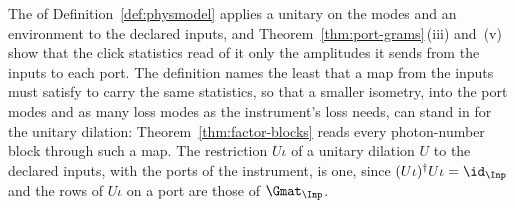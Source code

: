 
The  of Definition~\ref{def:physmodel} applies a unitary
on the modes and an environment to the declared inputs, and
Theorem~\ref{thm:port-grams}\,(iii) and~(v) show that the click statistics
read of it only the amplitudes it sends from the inputs to each port. The
definition names the least that a map from the inputs must satisfy to carry
the same statistics, so that a smaller isometry, into the port modes and as
many loss modes as the instrument's loss needs, can stand in for the unitary
dilation: Theorem~\ref{thm:factor-blocks} reads every photon-number block
through such a map. The restriction $U\iota$ of a unitary dilation $U$ to the
declared inputs, with the ports of the instrument, is one, since
$(U\iota)^{\dagger}U\iota=\id_{\Inp}$ and the rows of $U\iota$ on a port are
those of $\Gmat_{\Inp}$.

